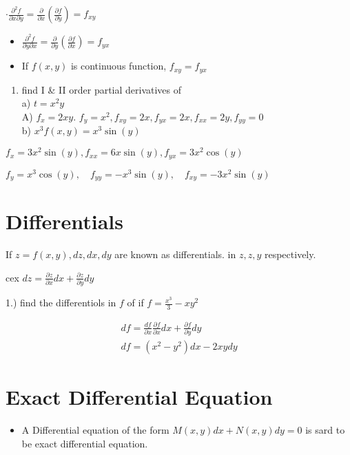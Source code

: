 \documentclass[12pt, a4paper]{article}
\begin{document}
$\cdot \frac{\partial^{2} f}{\partial x \partial y}=\frac{\partial}{\partial x}\left(\frac{\partial f}{\partial y}\right)=f_{x y}$

\begin{itemize}
	\item $\frac{\partial^{2} f}{\partial y \partial x}=\frac{\partial}{\partial y}\left(\frac{\partial f}{\partial x}\right)=f_{y x}$
\end{itemize}

\begin{itemize}
	\item If $f(x, y)$ is continuous function, $f_{x y}=f_{y x}$
\end{itemize}

\begin{enumerate}
	\item find I \& II order partial derivatives of\\
	      a) $t=x^2 y$\\
	      A) $f_{x}=2 x y$. $f_{y}=x^2 , f_{x y}=2 x, f_{y x}=2 x, f_{x x}=2 y, f_{y y}=0$\\
	      b) $x^{3} f(x, y)=x^{3} \sin(y)$
\end{enumerate}

$f_{x}=3 x^2 \sin(y), f_{x x}=6 x \sin(y), f_{y x}=3 x^2 \cos(y)$

$f_{y}=x^{3} \cos(y), \quad f_{y y}=-x^{3} \sin(y), \quad f_{x y}=-3 x^2 \sin(y)$

\section*{Differentials}
If $z=f(x, y), d z, d x, d y$ are known as differentials. in $z, z, y$ respectively.

cex $d z=\frac{\partial z}{\partial x} d x+\frac{\partial z}{\partial y} d y$

1.) find the differentiols in $f$ of if $f=\frac{x^{3}}{3}-x y^2$

$$
	\begin{array}{r}
		d f=\frac{d f}{\partial x} \frac{\partial f}{\partial x} d x+\frac{\partial f}{\partial y} d y \\
		d f=\left(x^2 -y^2\right) d x-2 x y d y
	\end{array}
$$

\section*{Exact Differential Equation}
\begin{itemize}
	\item A Differential equation of the form $M(x, y) d x+N(x, y) d y=0$ is sard to be exact differential equation.
\end{itemize}
\end{document}
